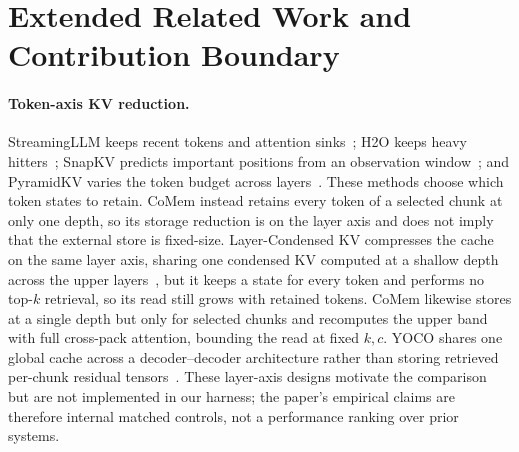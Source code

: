 
\section{Extended Related Work and Contribution Boundary}
\label{app:related}

\paragraph{Token-axis KV reduction.}
StreamingLLM keeps recent tokens and attention sinks~\citep{streamingllm}; H2O
keeps heavy hitters~\citep{h2o}; SnapKV predicts important positions from an
observation window~\citep{snapkv}; and PyramidKV varies the token budget across
layers~\citep{pyramidkv}.  These methods choose which token states to retain.
CoMem instead retains every token of a selected chunk at only one depth, so its
storage reduction is on the layer axis and does not imply that the external
store is fixed-size.  Layer-Condensed KV compresses the cache on the same layer
axis, sharing one condensed KV computed at a shallow depth across the upper
layers~\citep{lckv}, but it keeps a state for every token and performs no
top-$k$ retrieval, so its read still grows with retained tokens.  CoMem likewise
stores at a single depth but only for selected chunks and recomputes the upper
band with full cross-pack attention, bounding the read at fixed $k,c$.
YOCO shares one global cache across a decoder--decoder architecture rather than
storing retrieved per-chunk residual tensors~\citep{yoco}.  These layer-axis
designs motivate the comparison but are not implemented in our harness; the
paper's empirical claims are therefore internal matched controls, not a
performance ranking over prior systems.

